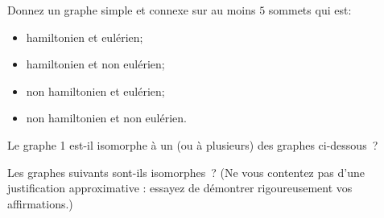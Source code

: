 \begin{exo}
Donnez un graphe simple et connexe sur au moins $5$ sommets qui est:
\begin{itemize}
\item hamiltonien et eul\'erien;
\item hamiltonien et non eul\'erien;
\item non hamiltonien et eul\'erien;
\item non hamiltonien et non eul\'erien.
\end{itemize}
\end{exo}

\begin{exo}
Le graphe 1 est-il isomorphe \`a un (ou \`a plusieurs) des graphes ci-dessous~?
\end{exo}

\begin{figure}[!h]
\centering
\scalebox{.825}{}
\caption{}
\end{figure}

\begin{figure}[!h]
\centering
\scalebox{.825}{}
\caption{}
\end{figure}

\newpage
\begin{exo}
Les graphes suivants sont-ils isomorphes~? (Ne vous contentez pas d'une justification approximative : essayez de d\'emontrer rigoureusement vos affirmations.)
\end{exo}

\begin{figure}[!h]
\centering

\caption{}
\end{figure}%

\begin{figure}[!h]
\centering

\caption{}
\end{figure}

\begin{figure}[!h]
\centering

\caption{}
\end{figure}
